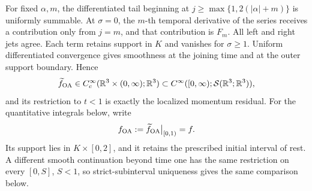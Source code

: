For fixed \(\alpha,m\), the differentiated tail beginning at
\(j\ge\max\{1,2(|\alpha|+m)\}\) is uniformly summable. At
\(\sigma=0\), the \(m\)-th temporal derivative of the series receives a
contribution only from \(j=m\), and that contribution is \(F_m\). All left
and right jets agree. Each term retains support in \(K\) and vanishes for
\(\sigma\ge1\). Uniform differentiated convergence gives smoothness at the
joining time and at the outer support boundary. Hence
\begin{equation}
 \widetilde f_{\rm OA}\in
 C_c^\infty(\mathbb R^3\times(0,\infty);\mathbb R^3)
 \subset C^\infty([0,\infty);\mathcal S(\mathbb R^3;\mathbb R^3)),
 \label{r:eq:oa-force-class}
\end{equation}
and its restriction to \(t<1\) is exactly the localized momentum residual.
For the quantitative integrals below, write
\begin{equation}
 f_{\rm OA}:=\widetilde f_{\rm OA}\big|_{[0,1)}=f.
 \label{r:eq:oa-force-restriction}
\end{equation}
Its support lies in \(K\times[0,2]\), and it retains the prescribed initial
interval of rest. A different smooth continuation beyond time one has the
same restriction on every \([0,S]\), \(S<1\), so strict-subinterval
uniqueness gives the same comparison below.
